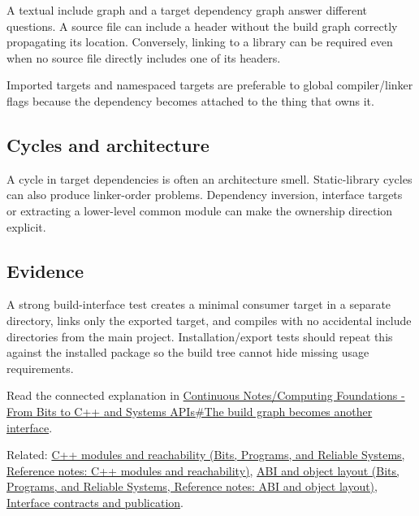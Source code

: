 A textual include graph and a target dependency graph answer different questions. A source file can include a header without the build graph correctly propagating its location. Conversely, linking to a library can be required even when no source file directly includes one of its headers.

Imported targets and namespaced targets are preferable to global compiler/linker flags because the dependency becomes attached to the thing that owns it.

\subsection{Cycles and architecture}\label{appendix-3327b8977adf-cycles-and-architecture}

A cycle in target dependencies is often an architecture smell. Static-library cycles can also produce linker-order problems. Dependency inversion, interface targets or extracting a lower-level common module can make the ownership direction explicit.

\subsection{Evidence}\label{appendix-3327b8977adf-evidence}

A strong build-interface test creates a minimal consumer target in a separate directory, links only the exported target, and compiles with no accidental include directories from the main project. Installation/export tests should repeat this against the installed package so the build tree cannot hide missing usage requirements.

Read the connected explanation in \hyperref[01-foundations-i-ch008-the-build-graph-becomes-another-interface]{Continuous Notes/Computing Foundations - From Bits to C++ and Systems APIs\#The build graph becomes another interface}.

Related: \href{../01-Bits-Programs-and-Reliable-Systems/main.pdf\#nameddest=appendix-410a611a5b8d}{C++ modules and reachability (Bits, Programs, and Reliable Systems, Reference notes: C++ modules and reachability)}, \href{../01-Bits-Programs-and-Reliable-Systems/main.pdf\#nameddest=appendix-c4ac6bb0fff8}{ABI and object layout (Bits, Programs, and Reliable Systems, Reference notes: ABI and object layout)}, \hyperref[appendix-fdae7ff0a23f]{Interface contracts and publication}.
